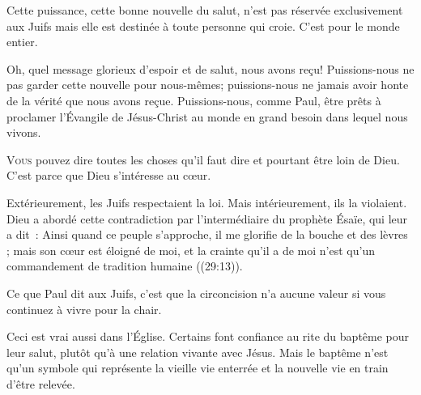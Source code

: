 Cette puissance, cette bonne nouvelle du salut, n'est pas réservée
 exclusivement aux Juifs mais elle est destinée à toute personne qui croie.
 C'est pour le monde entier.

Oh, quel message glorieux d'espoir et de salut, 
 nous avons re\c{c}u!  Puissions-nous ne pas garder cette nouvelle
 pour nous-mêmes; puissions-nous ne jamais avoir honte de la vérité
 que nous avons re\c{c}ue. Puissions-nous, comme Paul, être prêts à proclamer
 l'Évangile  de Jésus-Christ au monde en grand besoin
 dans lequel nous vivons.

\dvrule






\lettrine{V}{ous} pouvez dire toutes les choses qu'il faut dire
 et pourtant être loin de Dieu. C'est parce que Dieu s'intéresse au c\oe{}ur.

Extérieurement, les Juifs respectaient la loi. Mais intérieurement,
 ils la violaient. Dieu a abordé cette contradiction par l'intermédiaire
 du prophète Ésaïe, qui leur a dit~: 
 \Og Ainsi quand ce peuple s'approche, il me glorifie de la bouche
 et des lèvres ; mais son c\oe{}ur est éloigné de moi, et la crainte
 qu'il a de moi n'est qu'un commandement de tradition humaine \Fg{}
 ((29:13)). 


Ce que Paul dit aux Juifs, c'est que la circoncision n'a aucune valeur
 si vous continuez à vivre pour la chair.

Ceci est vrai aussi dans l'Église. 
 Certains font confiance au rite du baptême pour leur salut,
 plutôt qu'à une relation vivante avec Jésus.
 Mais le baptême n'est qu'un symbole qui représente la vieille vie
 enterrée et la nouvelle vie en train d'être relevée.

